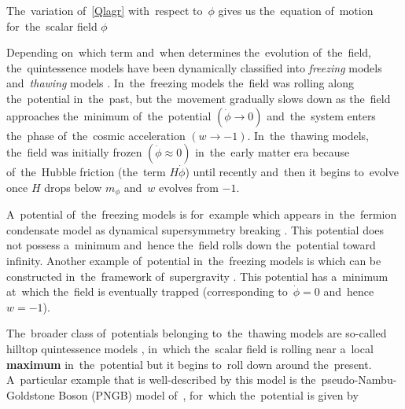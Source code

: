 {The~variation of~\eqref{Qlagr} with~respect to~$\phi$ gives us the~equation of~motion for~the~scalar field $\phi$

Depending on~which term and~when determines the~evolution of~the~field, the~quintessence models have been dynamically classified into \textit{freezing} models and~\textit{thawing} models \parencite{2005PhRvL..95n1301C}. In~the~freezing models the~field was rolling along the~potential in~the~past, but the~movement gradually slows down as the~field approaches the~minimum of~the~potential $(\dot{\phi}\rightarrow0)$ and~the~system enters the~phase of~the~cosmic acceleration $(w\rightarrow-1)$. In~the~thawing models, the~field was initially frozen $(\dot{\phi}\approx0)$ in~the~early matter era because of~the~Hubble friction (the~term $H\dot{\phi}$) until recently and~then it begins to~evolve once $H$ drops below $m_\phi$ and~$w$ evolves from $-1$.

A~potential of~the~freezing models is for~example
which appears in~the~fermion condensate model as dynamical supersymmetry breaking \parencite{1999PhRvD..60f3502B}. This potential does not possess a~minimum and~hence the~field rolls down the~potential toward infinity. Another example of~potential in~the~freezing models is
which can be constructed in~the~framework of~supergravity \parencite{1999PhLB..468...40B}. This potential has a~minimum at~which the~field is eventually trapped (corresponding to~$\dot{\phi}=0$ and~hence $w=-1$).

The~broader class of~potentials belonging to~the~thawing models are so-called hilltop quintessence models \parencite{2008PhRvD..78l3525D}, in~which the~scalar field is rolling near a~local \textbf{maximum} in~the~potential but it begins to~roll down around the~present. A~particular example that is well-described by this model is the~pseudo-Nambu-Goldstone Boson (PNGB) model of~\textcite{1995PhRvL..75.2077F}, for~which the~potential is given by
} %
